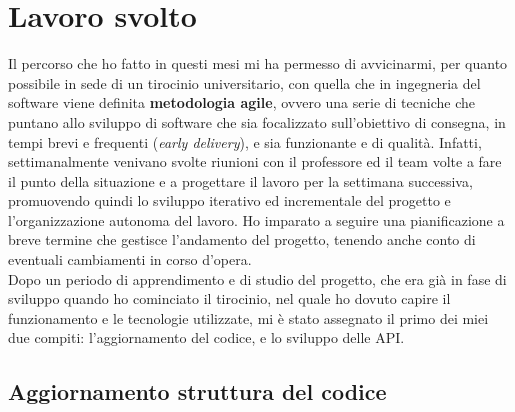 \documentclass[italian, Lau, oneside, nodefaultfont, noexaminfo]{sapthesis}
\begin{document}


\section{Lavoro svolto}

Il percorso che ho fatto in questi mesi mi ha permesso di avvicinarmi, per quanto   possibile in sede di un tirocinio universitario,  con quella che in ingegneria del software viene definita \textbf{metodologia agile}, ovvero una serie di tecniche  che puntano allo sviluppo di software che sia focalizzato sull'obiettivo di consegna, in tempi brevi e frequenti (\textit{early delivery}), e sia funzionante e di qualit\`a. Infatti, settimanalmente venivano svolte riunioni con il professore ed il team volte a fare il punto della situazione e a progettare il lavoro per la settimana successiva, promuovendo quindi lo sviluppo iterativo ed incrementale del progetto e l'organizzazione autonoma del lavoro. Ho imparato a seguire una pianificazione a breve termine che gestisce l'andamento del progetto, tenendo anche conto di eventuali  cambiamenti in corso d'opera. \\   


Dopo un periodo di apprendimento e di studio del progetto, che era gi\`a in fase di sviluppo quando ho cominciato il tirocinio, nel quale ho dovuto capire il funzionamento e le tecnologie utilizzate, mi \`e stato assegnato il primo dei miei due compiti: l'aggiornamento del codice, e lo sviluppo delle API.


\subsection{Aggiornamento struttura del codice}
\end{document}
